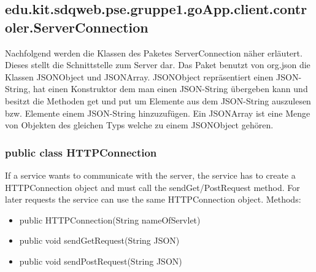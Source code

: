 \hypertarget{ServerConnection}{}
	\subsection{edu.kit.sdqweb.pse.gruppe1.goApp.client.controler.ServerConnection}
	 	Nachfolgend werden die Klassen des Paketes ServerConnection näher erläutert.
 	Dieses stellt die Schnittstelle zum Server dar. Das Paket benutzt von org.json die Klassen JSONObject und JSONArray.
 	JSONObject repräsentiert einen JSON-String, hat einen Konstruktor dem man einen JSON-String übergeben kann und besitzt die Methoden get und put um Elemente aus dem JSON-String auszulesen bzw. Elemente einem JSON-String hinzuzufügen. 
 	Ein JSONArray ist eine Menge von Objekten des gleichen Typs welche zu einem JSONObject gehören.
 	
	\subsubsection{public class HTTPConnection}
If a service wants to communicate with the server, the service has to create a HTTPConnection object and must call the sendGet/PostRequest method.
For later requests the service can use the same HTTPConnection object.
\newline Methods:
\begin{itemize}
	\item public HTTPConnection(String nameOfServlet)
		
		\item public void sendGetRequest(String JSON)
		
		\item public void sendPostRequest(String JSON)
	\end{itemize}
	
